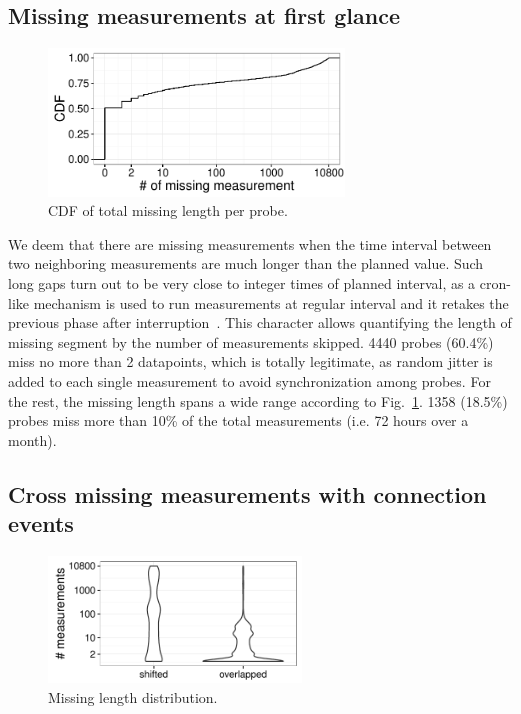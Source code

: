\subsection{Missing measurements at first glance}
\begin{figure}
\centering
\includegraphics[width=0.7\textwidth]{gfx/chap3/missing_length_cdf.pdf}
\caption{CDF of total missing length per probe.}
\label{fig:miss_len}
\end{figure}
We deem that there are missing measurements when the time interval between two neighboring measurements are much longer than the planned value. 
Such long gaps turn out to be very close to integer times of planned interval, as a cron-like mechanism is used to run measurements at regular interval and it retakes the previous phase after interruption~\cite{source, schedule}.
This character allows quantifying the length of missing segment by the number of measurements skipped.
4440 probes  (60.4\%) miss no more than 2 datapoints, which is totally legitimate, as random jitter is added to each single measurement to avoid synchronization among probes.
For the rest, the missing length spans a wide range according to Fig.~\ref{fig:miss_len}.
1358 (18.5\%) probes miss more than 10\% of the total measurements (i.e. 72 hours over a month).

\subsection{Cross missing measurements with connection events}

\begin{figure}[!htb]
\centering
\includegraphics[width=0.6\textwidth]{gfx/chap3/len_by_ratio.pdf}
\caption{Missing length distribution.}
\label{fig:len_ratio}
\end{figure}

